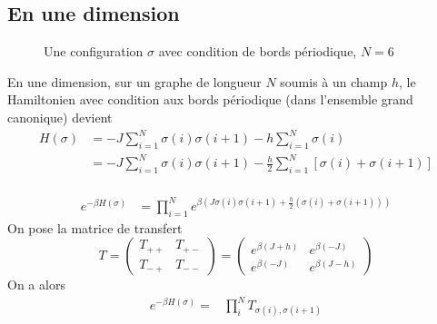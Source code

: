 \documentclass[french]{beamer}
\begin{document}
%
\subsection{En une dimension}
%

\begin{frame}
\begin{figure}
    \centering
    \caption{Une configuration $\sigma$ avec condition de bords périodique, $N = 6$}
\end{figure}
En une dimension, sur un graphe de longueur $N$ soumis à un champ $h$, le Hamiltonien avec condition aux bords  périodique (dans l'ensemble grand canonique) devient
\begin{align*}
H(\sigma) &= -J \sum_{i = 1}^{N} \sigma(i) \sigma(i + 1) -h \sum_{i = 1}^{N} \sigma(i) \\
                         & = -J \sum_{i = 1}^{N} \sigma(i) \sigma(i + 1) -\frac{h}{2} \sum_{i = 1}^{N} \left[\sigma(i) + \sigma(i+1)\right]\\
\end{align*}
\end{frame}

\begin{frame}
\begin{align*}
	e^{-\beta H(\sigma)} &= \prod_{i = 1}^{N} e^{\beta \left(J\sigma(i)\sigma(i+1) +\frac{h}{2}\left(\sigma(i) + \sigma(i+1)\right)\right) }
\end{align*}
On pose la matrice de transfert
   \[T =
   \begin{pmatrix}
   T_{++} & T_{+-} \\
   T_{-+}  &  T_{--}
   \end{pmatrix}
   =
   \begin{pmatrix}
   e^{\beta(J + h)}  &   e^{\beta(- J)} \\
   e^{\beta(-J)} & e^{\beta(J - h)}
   \end{pmatrix}
   \]
   On a alors
   \begin{align*}
   e^{-\beta H(\sigma)} =& \prod_{i}^{N} T_{\sigma(i), \sigma(i+1)}
   \end{align*}
\end{frame}
\end{document}
